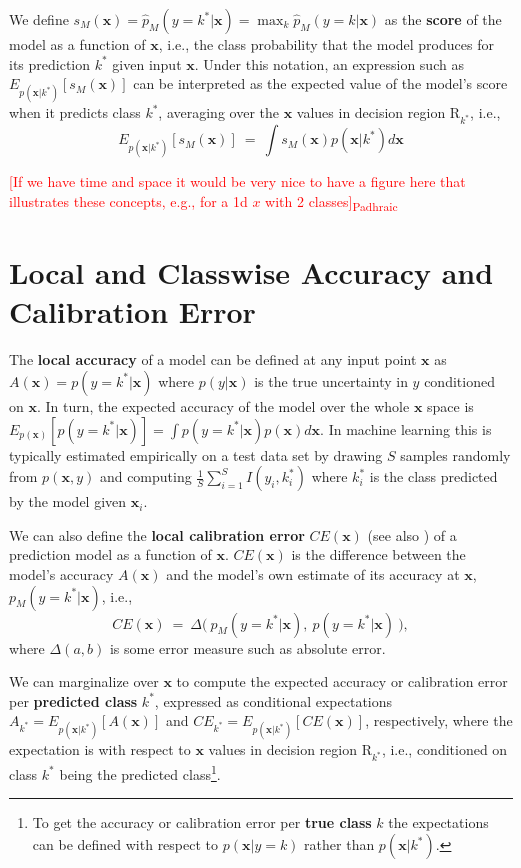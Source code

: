 \documentclass{article}
\newcommand{\ux}{{\mathbf{x}}}
\newcommand{\padhraic}[1]{\textcolor{Red}{[#1]\textsubscript{Padhraic}}}
\newcommand{\robby}[1]{\textcolor{Red}{[#1]\textsubscript{Robby}}}
\begin{document}
We define $s_M(\ux) = \hat{p}_M(y = k^*| \ux) = \max_k \hat{p}_M(y = k | \ux)$ as the {\bf score} of the model as a function of $\ux$, i.e., the class probability that the model produces for its prediction $k^*$  given input $\ux$.
Under this notation, an expression such as $E_{p(\ux | k^*)}[s_M(\ux)]$ can be interpreted as the expected value of the model's score when it predicts class $k^*$, averaging over the $\ux$ values in decision region $\mbox{R}_{k^*}$, i.e.,
\[
    E_{p(\ux | k^*)}[s_M(\ux)] \ = \ \int s_M(\ux) p(\ux | k^*) d\ux
\]

\padhraic{If we have time and space it would be very nice to have a figure here that illustrates these concepts, e.g., for a 1d $x$ with 2 classes}

\section{Local and Classwise Accuracy and Calibration Error}

The {\bf local accuracy} of a model can be defined at any input point $\ux$ as $A(\ux) = p(y = k^*| \ux)$ where $p(y | \ux)$ is the true uncertainty in $y$ conditioned on $\ux$.
In turn, the expected accuracy of the model over the whole $\ux$ space is $E_{p(\ux)}[p(y = k^*| \ux)] = \int p(y = k^*| \ux) p(\ux) d\ux$.
In machine learning this is typically estimated empirically on a test data set by drawing $S$ samples randomly from $p(\ux,y)$ and computing $\frac{1}{S} \sum_{i=1}^S I(y_i, k_i^*)$ where $k_i^*$ is the class predicted by the model given $\ux_i$.

We can also define the {\bf local calibration error} $CE(\ux)$ (see also \citet{vaicenavicius19a}) of a prediction model as a function of $\ux$.
$CE(\ux)$ is the difference between the model's accuracy $A(\ux)$ and the model's own estimate of its accuracy at $\ux$, $p_M(y = k^*| \ux)$, i.e.,
\[
    CE(\ux) \ = \  \Delta\bigl(\ p_M(y = k^*| \ux), \  p(y =k^*| \ux) \  \bigr),
\]
where $\Delta(a,b)$ is some error measure such as absolute error. %

We can marginalize over $\ux$ to compute the expected accuracy or calibration error per {\bf predicted class} $k^*$, expressed as conditional expectations $A_{k^*}  = E_{p(\ux|k^*)}[A(\ux)]$ and $CE_{k^*} = E_{p(\ux|k^*)}[ CE(\ux)]$, respectively, where the expectation is with respect to $\ux$ values in decision region $\mbox{R}_{k^*}$, i.e., conditioned on class $k^* $ being the predicted class\footnote{To get the accuracy or calibration error per {\bf true class} $k$ the expectations can be defined with respect to $p(\ux | y = k)$  rather than $p(\ux|k^*)$.}.
\end{document}
